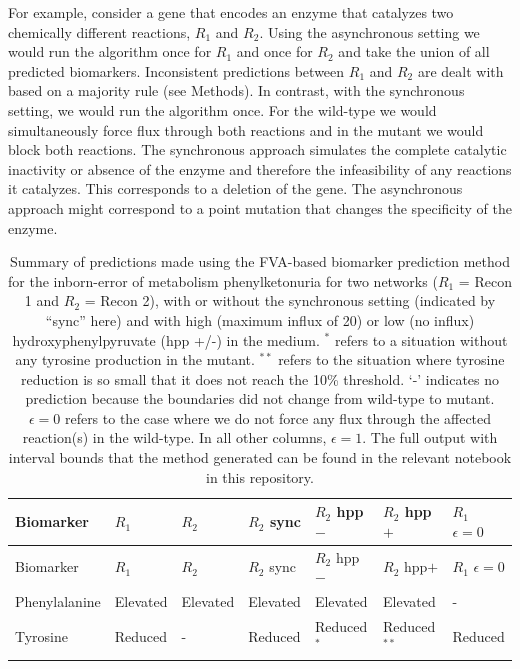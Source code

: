 \documentclass[10pt,a4paper,onecolumn]{article}
\begin{document}
For example, consider a gene that encodes an enzyme that catalyzes two
chemically different reactions, \(R_1\) and \(R_2\). Using the
asynchronous setting we would run the algorithm once for \(R_1\) and
once for \(R_2\) and take the union of all predicted biomarkers.
Inconsistent predictions between \(R_1\) and \(R_2\) are dealt with
based on a majority rule (see Methods). In contrast, with the
synchronous setting, we would run the algorithm once. For the wild-type
we would simultaneously force flux through both reactions and in the
mutant we would block both reactions. The synchronous approach simulates
the complete catalytic inactivity or absence of the enzyme and therefore
the infeasibility of any reactions it catalyzes. This corresponds to a
deletion of the gene. The asynchronous approach might correspond to a
point mutation that changes the specificity of the enzyme.

\hypertarget{tbl:PKU_results}{}
\begin{longtable}[]{@{}lllllll@{}}
\caption{\label{tbl:PKU_results}Summary of predictions made using the
FVA-based biomarker prediction method for the inborn-error of metabolism
phenylketonuria for two networks (\(R_1\) = Recon 1 and \(R_2\) = Recon
2), with or without the synchronous setting (indicated by ``sync'' here)
and with high (maximum influx of 20) or low (no influx)
hydroxyphenylpyruvate (hpp +/-) in the medium. \(^*\) refers to a
situation without any tyrosine production in the mutant. \(^{**}\)
refers to the situation where tyrosine reduction is so small that it
does not reach the 10\% threshold. `-' indicates no prediction because
the boundaries did not change from wild-type to mutant. \(\epsilon = 0\)
refers to the case where we do not force any flux through the affected
reaction(s) in the wild-type. In all other columns, \(\epsilon = 1\).
The full output with interval bounds that the method generated can be
found in the relevant notebook in this repository. }\tabularnewline
\toprule
Biomarker & \(R_1\) & \(R_2\) & \(R_2\) sync & \(R_2\) hpp\(-\) &
\(R_2\) hpp\(+\) & \(R_1\) \(\epsilon = 0\)\tabularnewline
\midrule
\endfirsthead
\toprule
Biomarker & \(R_1\) & \(R_2\) & \(R_2\) sync & \(R_2\) hpp\(-\) &
\(R_2\) hpp\(+\) & \(R_1\) \(\epsilon = 0\)\tabularnewline
\midrule
\endhead
Phenylalanine & Elevated & Elevated & Elevated & Elevated & Elevated &
-\tabularnewline
Tyrosine & Reduced & - & Reduced & Reduced\(^*\) & Reduced\(^{**}\) &
Reduced\tabularnewline
\bottomrule
\end{longtable}
\end{document}
